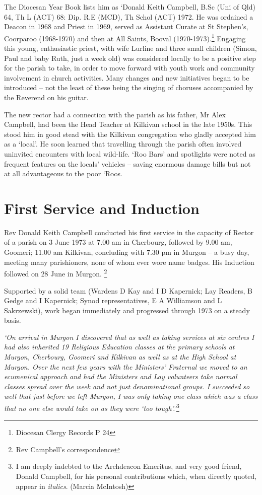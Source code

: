 The Diocesan Year Book lists him as `Donald Keith Campbell, B.Sc (Uni of Qld) 64, Th L (ACT) 68: Dip. R.E (MCD), Th Schol (ACT) 1972. He was ordained a Deacon in 1968 and Priest in 1969, served as Assistant Curate at St Stephen's, Coorparoo (1968-1970) and then at All Saints, Booval (1970-1973).\footnote{Diocesan Clergy Records P 24} Engaging this young, enthusiastic priest, with wife Lurline and three small children (Simon, Paul and baby Ruth, just a week old) was considered locally to be a positive step for the parish to take, in order to move forward with youth work and community involvement in church activities. Many changes and new initiatives began to be introduced -- not the least of these being the singing of choruses accompanied by the Reverend on his guitar.


The new rector had a connection with the parish as his father, Mr Alex Campbell, had been the Head Teacher at Kilkivan school in the late 1950s. This stood him in good stead with the Kilkivan congregation who gladly accepted him as a `local'. He soon learned that travelling through the parish often involved uninvited encounters with local wild-life. `Roo Bars' and spotlights were noted as frequent features on the locals' vehicles -- saving enormous damage bills but not at all advantageous to the poor `Roos.



\section{First Service and Induction}



Rev Donald Keith Campbell conducted his first service in the capacity of Rector of a parish on 3 June 1973 at 7.00 am in Cherbourg, followed by 9.00 am, Goomeri; 11.00 am Kilkivan, concluding with 7.30 pm in Murgon -- a busy day, meeting many parishioners, none of whom ever wore name badges. His Induction followed on 28 June in Murgon. \footnote{Rev Campbell's correspondence}


Supported by a solid team (Wardens D Kay and I D Kapernick; Lay Readers, B Gedge and I Kapernick; Synod representatives, E A Williamson and L Sakrzewski), work began immediately and progressed through 1973 on a steady basis.



\emph{`On arrival in Murgon I discovered that as well as taking services at six centres I had also inherited 19 Religious Education classes at the primary schools at Murgon, Cherbourg, Goomeri and Kilkivan as well as at the High School at Murgon. Over the next few years with the Ministers' Fraternal we moved to an ecumenical approach and had the Ministers and Lay volunteers take normal classes spread over the week and not just denominational groups. I succeeded so well that just before we left Murgon, I was only taking one class which was a class that no one else would take on as they were `too tough'.'}\footnote{I am deeply indebted to the Archdeacon Emeritus, and very good friend, Donald Campbell, for his personal contributions which, when directly quoted, appear in \emph{italics}. (Marcia McIntosh)}


